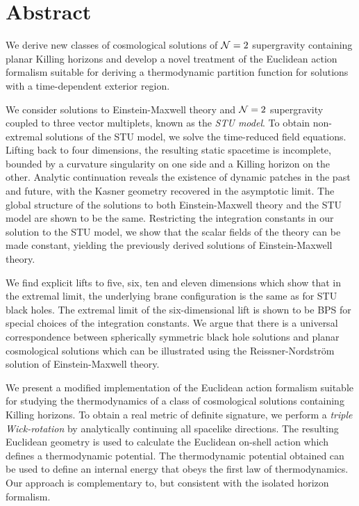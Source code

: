 
\chapter*{Abstract}

We derive new classes of cosmological solutions of ${\cal N} = 2$ supergravity containing planar Killing horizons and develop a novel treatment of the Euclidean action formalism suitable for deriving a thermodynamic partition function for solutions with a time-dependent exterior region.

We consider solutions to Einstein-Maxwell theory and ${\cal N} = 2$ supergravity coupled to three vector multiplets, known as the \emph{STU model}. To obtain non-extremal solutions of the STU model, we solve the time-reduced field equations. Lifting back to four dimensions, the resulting static spacetime is incomplete, bounded by a curvature singularity on one side and a Killing horizon on the other. Analytic continuation reveals the existence of dynamic patches in the past and future, with the Kasner geometry recovered in the asymptotic limit. The global structure of the solutions to both Einstein-Maxwell theory and the STU model are shown to be the same. Restricting the integration constants in our solution to the STU model, we show that the scalar fields of the theory can be made constant, yielding the previously derived solutions of Einstein-Maxwell theory.

We find explicit lifts to five, six, ten and eleven dimensions which show that in the extremal limit, the underlying brane configuration is the same as for STU black holes. The extremal limit of the six-dimensional lift is shown to be BPS for special choices of the integration constants. We argue that there is a universal correspondence between spherically symmetric black hole solutions and planar cosmological solutions which can be illustrated using the Reissner-Nordstr\"om solution of Einstein-Maxwell theory.

We present a modified implementation of the Euclidean action formalism suitable for studying the thermodynamics of a class of cosmological solutions containing Killing horizons. To obtain a real metric of definite signature, we perform a \emph{triple Wick-rotation} by analytically continuing all spacelike directions. The resulting Euclidean geometry is used to calculate the Euclidean on-shell action which defines a thermodynamic potential. The thermodynamic potential obtained can be used to define an internal energy that obeys the first law of thermodynamics. Our approach is complementary to, but consistent with the isolated horizon formalism. 

